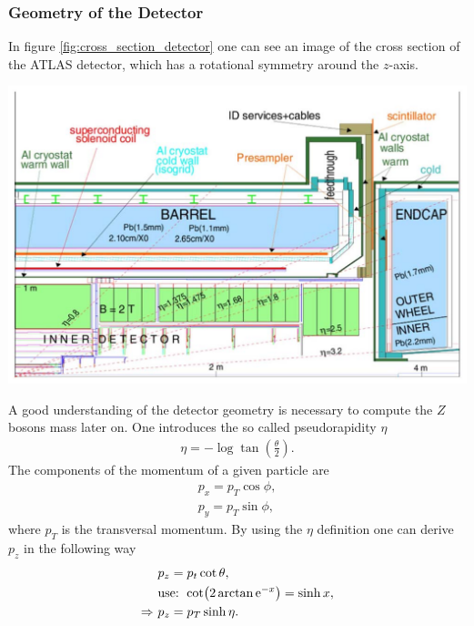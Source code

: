 \documentclass[12pt, a4paper, bibliography=totoc]{scrartcl}
\begin{document}
\begin{multicols}{2}
\subsubsection{Geometry of the Detector}
In figure \ref{fig:cross_section_detector} one can see an image of the cross section of the ATLAS detector, which has a rotational symmetry around the $z$-axis.
\begin{center}
	\includegraphics[width=0.8\linewidth]{fig/detector_geometry.png}
	\label{fig:cross_section_detector}
\end{center}
A good understanding of the detector geometry is necessary to compute the $Z$ bosons mass later on. 
One introduces the so called pseudorapidity $\eta$
\begin{align}
    \eta = - \log \tan \left( \frac{\theta}{2} \right).
\end{align}
The components of the momentum of a given particle are
\begin{align}
    p_x = p_T \cos \phi , \\
    p_y = p_T \sin \phi ,
\end{align}
where $p_T$ is the transversal momentum.
By using the $\eta$ definition one can derive $p_z$ in the following way
\begin{align}
    & p_z = p_t \cot \theta , \\
    & \text{use: } \cot (2\arctan \mathrm{e}^{-x}) = \sinh x , \\
    \Rightarrow \ & p_z = p_T \sinh \eta .
\end{align}


\end{multicols}
\end{document}
